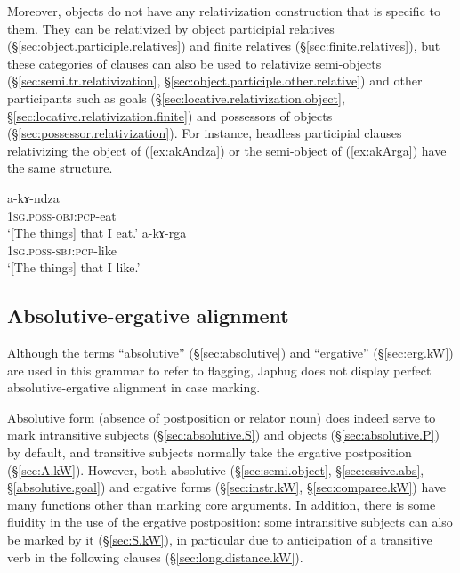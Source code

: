Moreover, objects do not have any relativization construction that is specific to them. They can be relativized by object participial relatives (§\ref{sec:object.participle.relatives}) and finite relatives (§\ref{sec:finite.relatives}), but these categories of clauses can also be used to relativize semi-objects (§\ref{sec:semi.tr.relativization}, §\ref{sec:object.participle.other.relative}) and other participants  such as goals (§\ref{sec:locative.relativization.object}, §\ref{sec:locative.relativization.finite}) and possessors of objects (§\ref{sec:possessor.relativization}). For instance, headless participial clauses relativizing the object of  (\ref{ex:akAndza}) or the semi-object of  (\ref{ex:akArga}) have the same structure.
 
\begin{exe} 
\ex 
\begin{xlist}
\ex \label{ex:akAndza}
\gll a-kɤ-ndza \\
\textsc{1sg}.\textsc{poss}-\textsc{obj}:\textsc{pcp}-eat \\
\glt `[The things] that I eat.' 
\ex \label{ex:akArga}
\gll a-kɤ-rga  \\
\textsc{1sg}.\textsc{poss}-\textsc{sbj}:\textsc{pcp}-like \\
\glt `[The things] that I like.' 
\end{xlist}
\end{exe}

\subsection{Absolutive-ergative alignment}
Although the terms ``absolutive'' (§\ref{sec:absolutive}) and ``ergative'' (§\ref{sec:erg.kW}) are used in this grammar to refer to flagging, Japhug does not display perfect absolutive-ergative alignment in case marking.

Absolutive form (absence of postposition or relator noun) does indeed serve to mark intransitive subjects (§\ref{sec:absolutive.S}) and objects (§\ref{sec:absolutive.P}) by default, and transitive subjects normally take the ergative  postposition (§\ref{sec:A.kW}). However, both absolutive (§\ref{sec:semi.object}, §\ref{sec:essive.abs}, §\ref{absolutive.goal}) and ergative forms (§\ref{sec:instr.kW}, §\ref{sec:comparee.kW}) have many functions other than marking core arguments. In addition, there is some fluidity in the use of the ergative postposition: some intransitive subjects can also be marked by it (§\ref{sec:S.kW}), in particular due to anticipation of  a transitive verb in the following clauses (§\ref{sec:long.distance.kW}).

